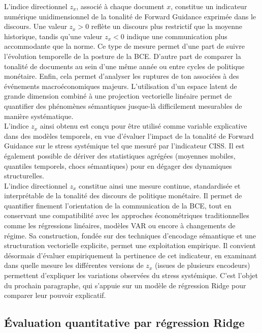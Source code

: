 L’indice directionnel $z_x$, associé à chaque document $x$, constitue un indicateur numérique unidimensionnel de la tonalité de Forward Guidance exprimée dans le discours. Une valeur $z_x > 0$ reflète un discours plus restrictif que la moyenne historique, tandis qu’une valeur $z_x < 0$ indique une communication plus accommodante que la norme. Ce type de mesure permet d'une part de suivre l’évolution temporelle de la posture de la BCE. D'autre part de comparer la tonalité de documents au sein d’une même année ou entre cycles de politique monétaire. Enfin, cela permet d'analyser les ruptures de ton associées à des événements macroéconomiques majeurs. L’utilisation d’un espace latent de grande dimension combiné à une projection vectorielle linéaire permet de quantifier des phénomènes sémantiques jusque-là difficilement mesurables de manière systématique.\\

L’indice $z_x$ ainsi obtenu est conçu pour être utilisé comme variable explicative dans des modèles temporels, en vue d’évaluer l’impact de la tonalité de Forward Guidance sur le stress systémique tel que mesuré par l’indicateur CISS. Il est également possible de dériver des statistiques agrégées (moyennes mobiles, quantiles temporels, chocs sémantiques) pour en dégager des dynamiques structurelles.\\

L’indice directionnel $z_x$ constitue ainsi une mesure continue, standardisée et interprétable de la tonalité des discours de politique monétaire. Il permet de quantifier finement l’orientation de la communication de la BCE, tout en conservant une compatibilité avec les approches économétriques traditionnelles comme les régressions linéaires, modèles VAR ou encore à changements de régime. Sa construction, fondée sur des techniques d’encodage sémantique et une structuration vectorielle explicite, permet une exploitation empirique. Il convient désormais d’évaluer empiriquement la pertinence de cet indicateur, en examinant dans quelle mesure les différentes versions de $z_x$ (issues de plusieurs encodeurs) permettent d’expliquer les variations observées du stress systémique. C’est l’objet du prochain paragraphe, qui s’appuie sur un modèle de régression Ridge pour comparer leur pouvoir explicatif.

\subsection{Évaluation quantitative par régression Ridge}

